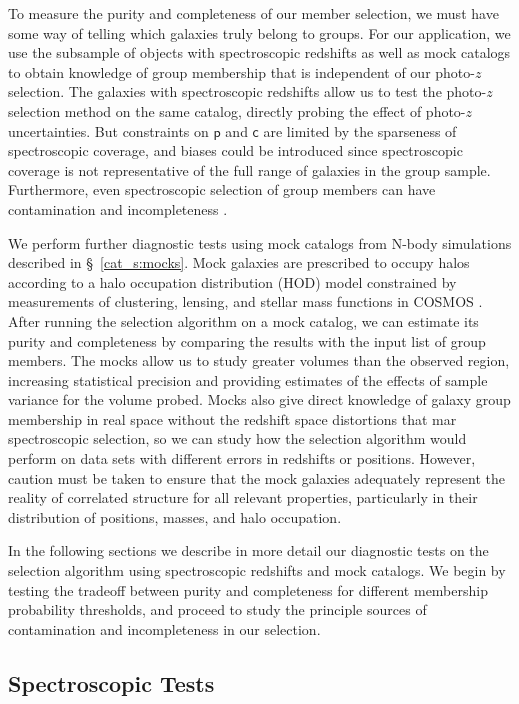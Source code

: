 To measure the purity and completeness of our member selection, we
must have some way of telling which galaxies truly belong to
groups. For our application, we use the subsample of objects with
spectroscopic redshifts as well as mock catalogs to obtain knowledge
of group membership that is independent of our photo-$z$ selection. 
The galaxies with spectroscopic redshifts allow us to test the photo-$z$
selection method on the same catalog, directly probing the effect of
photo-$z$ uncertainties. But constraints on $\mathsf{p}$ and $\mathsf{c}$
are limited by the sparseness of spectroscopic coverage, and biases
could be introduced since spectroscopic coverage is not representative
of the full range of galaxies in the group sample. Furthermore, even
spectroscopic selection of group members can have contamination and
incompleteness \citep[e.g.,][]{Gerke2005}.

We perform further diagnostic tests using mock catalogs from N-body
simulations described in \S~\ref{cat_s:mocks}. Mock galaxies are prescribed to occupy halos according to
a halo occupation distribution (HOD) model constrained by measurements
of clustering, lensing, and stellar mass functions in COSMOS
\citep{Leauthaud2011a, Leauthaud2011b}. After running 
the selection algorithm on a mock catalog, we can estimate its purity
and completeness by comparing the results with the input list of group
members. The mocks allow us to study
greater volumes than the observed region, increasing statistical
precision and providing estimates of the effects of sample variance for
the volume probed. Mocks also give direct knowledge of galaxy group membership in real
space without the redshift space distortions that mar spectroscopic
selection, so we can study how the selection algorithm would perform
on data sets with different errors in redshifts or positions. However,
caution must be taken to ensure that the mock 
galaxies adequately represent the reality of correlated structure for
all relevant properties, particularly in their distribution of
positions, masses, and halo occupation.

In the following sections we describe in more detail our diagnostic
tests on the selection algorithm using spectroscopic redshifts and
mock catalogs. We begin by testing the tradeoff between purity and
completeness for different membership probability thresholds, and
proceed to study the principle sources of contamination and
incompleteness in our selection.

\subsection{Spectroscopic Tests}

